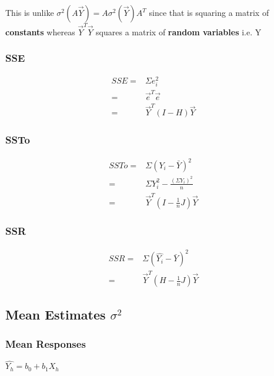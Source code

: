 \documentclass[11pt]{article}
\begin{document}
This is unlike \(\sigma^2 (A \vec{Y}) = A \sigma^2 (\vec{Y}) A^T\) since that is
squaring a matrix of \textbf{constants} whereas \(\vec{Y}^T \vec{Y}\) squares a matrix
of \textbf{random variables} i.e. Y

\subsubsection{SSE}
\label{sec:orgd82aa1c}
\begin{equation}
  \begin{split}
   SSE = & \Sigma e_i^2\\
       = & \vec{e}^T \vec{e}\\
       = & \vec{Y}^T (I - H) \vec{Y}
  \end{split}
\end{equation}

\subsubsection{SSTo}
\label{sec:orgcabb49a}

\begin{equation}
  \begin{split}
    SSTo = & \Sigma (Y_i - \bar{Y})^2\\
         = & \Sigma Y_i^2 - \frac{(\Sigma Y_i)^2}{n}\\
         = & \vec{Y}^T (I - \frac{1}{n} J) \vec{Y}
  \end{split}
\end{equation}

\subsubsection{SSR}
\label{sec:org7f4f982}

\begin{equation}
  \begin{split}
    SSR = & \Sigma (\hat{Y_i} - \bar{Y})^2\\
        = & \vec{Y}^T (H - \frac{1}{n} J) \vec{Y}
  \end{split}
\end{equation}

\subsection{Mean Estimates \(\sigma^2\)}
\label{sec:orgfea7290}
\subsubsection{Mean Responses}
\label{sec:orgf11a509}
\(\hat{Y_h} = b_0 + b_1 X_h\)
\end{document}
